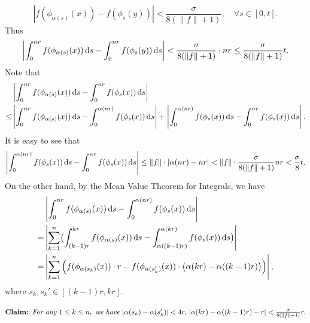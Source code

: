\documentclass[10pt]{article}
\newtheorem*{Theorem A}{Theorem A}
\begin{document}
\[
\left| f(\phi_{\alpha(s)}(x)) - f(\phi_s(y)) \right| < \frac{\sigma}{8(\| f \| + 1)}, \quad \forall s \in [0,t].
\]
Thus
\[
\left| \int_0^{nr} f(\phi_{\alpha(s)}(x)) \, {\rm d}s - \int_0^{nr} f(\phi_s(y)) \, {\rm d}s \right| < \frac{\sigma}{8(\| f \| + 1)} \cdot nr \leq \frac{\sigma}{8(\| f \| + 1)} t.
\]
Note that
\begin{align*}
&\left| \int_0^{nr}f(\phi_{\alpha(s)}(x)) \, {\rm d}s - \int_0^{nr} f(\phi_s(x)) \, {\rm d}s \right| \\
\leq &\left| \int_0^{nr} f(\phi_{\alpha(s)}(x)) \, {\rm d}s - \int_0^{\alpha(nr)} f(\phi_s(x)) \, {\rm d}s \right| + \left| \int_0^{\alpha(nr)} f(\phi_s(x)) \, {\rm d}s - \int_0^{nr} f(\phi_s(x)) \, {\rm d}s \right|.
\end{align*}
It is easy to see that
\[
\left| \int_0^{\alpha(nr)} f(\phi_s(x)) \, {\rm d}s - \int_0^{nr} f(\phi_s(x)) \, {\rm d}s \right| \leq \| f \| \cdot |\alpha(nr) - nr| < \| f\| \cdot \frac{\sigma}{8(\| f\| + 1)} nr < \frac{\sigma}{8} t.
\]
On the other hand, by the Mean Value Theorem for Integrals, we have
\begin{align*}
&\left| \int_0^{nr} f(\phi_{\alpha(s)}(x)) \, {\rm d}s - \int_0^{\alpha(nr)} f(\phi_s(x)) \, {\rm d}s \right| \\
=& \left| \displaystyle\sum_{k=1}^n \bigl(\int_{(k-1)r}^{kr} f(\phi_{\alpha(s)}(x)) \, {\rm d}s - \int_{\alpha((k-1)r)}^{\alpha(kr)} f(\phi_s(x)) \, {\rm d}s \bigr) \right| \\
=& \left| \sum_{k=1}^n \left( f(\phi_{\alpha(s_k)}(x)) \cdot r - f(\phi_{\alpha(s_k')}(x)) \cdot \bigl( \alpha(kr) - \alpha((k-1)r) \bigr) \right) \right|,
\end{align*}
where \(s_k, s_k' \in [(k-1)r, kr].\)

\bigskip

\noindent
$\textbf{Claim: }
\emph{For any } 1 \leq k \leq n, \emph{ we have }
|\alpha(s_k) - \alpha(s_k')| < 4r,\, |\alpha(kr) - \alpha((k-1)r) - r| < \frac{\sigma}{8(\| f \| + 1)} r.$
\end{document}
